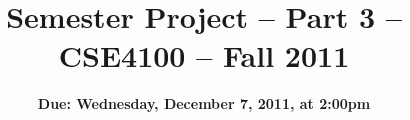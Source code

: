 \flushbottom
\addtolength{\topmargin}{-.8in}
\addtolength{\oddsidemargin}{-.9in}
\addtolength{\textheight}{1.6 in}
\addtolength{\textwidth}{1.6 in}
\renewcommand{\baselinestretch}{1.05}
\pagestyle{empty}
\thispagestyle{empty}
\title{\large {\bf Semester Project -- Part 3 -- CSE4100 -- Fall 2011}}
\author{\large {\bf Due: Wednesday, December 7, 2011, at 2:00pm}}
\pagestyle{empty}
\thispagestyle{empty}

\date{}
\pagestyle{empty}
\thispagestyle{empty}
\maketitle
\normalsize
\vspace{-0.13in}

